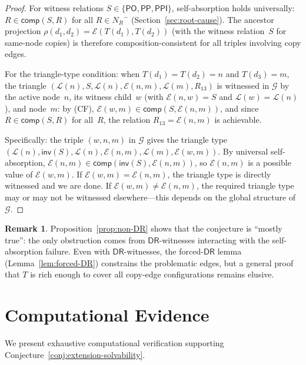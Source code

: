 \documentclass[a4paper,11pt]{article}
\theoremstyle{definition}
\newtheorem{remark}[theorem]{Remark}
\newcommand{\NR}{\ensuremath{N_R}}
\newcommand{\DR}{\ensuremath{\mathsf{DR}}}
\newcommand{\PO}{\ensuremath{\mathsf{PO}}}
\newcommand{\PP}{\ensuremath{\mathsf{PP}}}
\newcommand{\PPI}{\ensuremath{\mathsf{PPI}}}
\newcommand{\inv}{\ensuremath{\mathsf{inv}}}
\newcommand{\comp}{\ensuremath{\mathsf{comp}}}
\begin{document}
\begin{proof}
For witness relations $S \in \{\PO, \PP, \PPI\}$, self-absorption
holds universally: $R \in \comp(S, R)$ for all $R \in \NR^{-}$
(Section~\ref{sec:root-cause}).  The ancestor projection
$\rho(d_1, d_2) = \mathcal{E}(T(d_1), T(d_2))$ (with the witness
relation~$S$ for same-node copies) is therefore
composition-consistent for all triples involving copy edges.

For the triangle-type condition: when $T(d_1) = T(d_2) = n$ and
$T(d_3) = m$, the triangle
$(\mathcal{L}(n), S, \mathcal{L}(n), \mathcal{E}(n,m),
\mathcal{L}(m), R_{13})$ is witnessed in $\mathcal{G}$ by the active
node~$n$, its witness child~$w$ (with $\mathcal{E}(n,w) = S$ and
$\mathcal{L}(w) = \mathcal{L}(n)$), and node~$m$: by (CF),
$\mathcal{E}(w, m) \in \comp(S, \mathcal{E}(n,m))$, and since
$R \in \comp(S, R)$ for all~$R$, the relation
$R_{13} = \mathcal{E}(n,m)$ is achievable.

Specifically: the triple $(w, n, m)$ in $\mathcal{G}$ gives the
triangle type
$(\mathcal{L}(n), \inv(S), \mathcal{L}(n), \mathcal{E}(n,m),
\mathcal{L}(m), \mathcal{E}(w,m))$.  By universal self-absorption,
$\mathcal{E}(n,m) \in \comp(\inv(S), \mathcal{E}(n,m))$, so
$\mathcal{E}(n,m)$ is a possible value of $\mathcal{E}(w,m)$.
If $\mathcal{E}(w,m) = \mathcal{E}(n,m)$, the triangle type is
directly witnessed and we are done.  If
$\mathcal{E}(w,m) \neq \mathcal{E}(n,m)$, the required triangle type
may or may not be witnessed elsewhere---this depends on the global
structure of $\mathcal{G}$.
\end{proof}

\begin{remark}
Proposition~\ref{prop:non-DR} shows that the conjecture is
``mostly true'': the only obstruction comes from $\DR$-witnesses
interacting with the self-absorption failure.  Even with
$\DR$-witnesses, the forced-$\DR$ lemma
(Lemma~\ref{lem:forced-DR}) constrains the problematic edges, but a
general proof that $T$ is rich enough to cover all copy-edge
configurations remains elusive.
\end{remark}


\section{Computational Evidence}
\label{sec:computation}

We present exhaustive computational verification supporting
Conjecture~\ref{conj:extension-solvability}.
\end{document}
